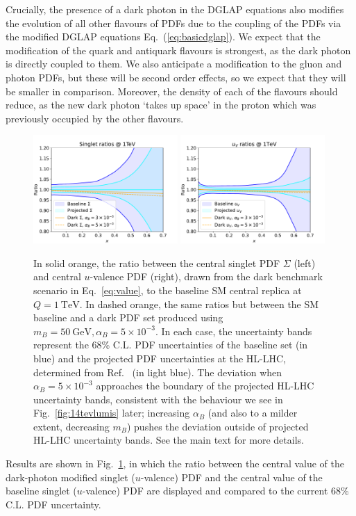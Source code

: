 \documentclass[withindex,glossary]{cam-thesis}
\begin{document}
Crucially, the presence of a dark photon in the DGLAP equations also
modifies the evolution of all other flavours of PDFs due to the
coupling of the PDFs via the modified DGLAP equations
Eq.~(\ref{eq:basicdglap}).
We expect that the modification of the quark and antiquark 
flavours is strongest, as the dark photon is directly coupled to
them. We also anticipate a modification to the gluon and photon
PDFs, but these will be second order effects, so we expect that they
will be smaller in comparison. Moreover, the density of each of the
flavours should reduce, as the new dark photon `takes up space' in the
proton which was previously occupied by the other flavours.
\begin{figure}[tb]
\centering
\includegraphics[width=0.49\textwidth]{darkphoton_figures/singlet_ratios_1TeV.pdf}
\includegraphics[width=0.49\textwidth]{darkphoton_figures/uvalence_ratios_1TeV.pdf}
\caption{In solid orange, the ratio between the central singlet PDF $\Sigma$ (left) and central $u$-valence
  PDF (right), drawn from the dark benchmark scenario in Eq.~\eqref{eq:value}, 
  to the baseline SM central replica at $Q = 1\
  \text{TeV}$. In dashed orange, the same ratios but between the SM baseline and a dark PDF set
  produced using $m_B = 50\ \text{GeV}, \alpha_B = 5 \times 10^{-3}$. In each case, the uncertainty bands
  represent the 68\% C.L. PDF uncertainties of the baseline set (in blue) 
  and the projected PDF uncertainties at the HL-LHC, determined
  from Ref.~\cite{Khalek:2018} (in light blue). The deviation when $\alpha_B = 5 \times 10^{-3}$ approaches
  the boundary of the projected HL-LHC uncertainty bands, consistent with the behaviour we see in Fig.~\ref{fig:14tevlumis} later; increasing $\alpha_B$ (and also to a milder extent, decreasing $m_B$) pushes the deviation outside of projected HL-LHC uncertainty bands.
  See the main text for more details.}
\label{fig:ratio_quarks}
\end{figure}
Results are shown in Fig.~\ref{fig:ratio_quarks}, in which the ratio
between the central value of the dark-photon modified singlet
($u$-valence) PDF and the central value of the baseline singlet
($u$-valence) PDF are displayed and compared to the current 68\% C.L. PDF
uncertainty. 
\end{document}
